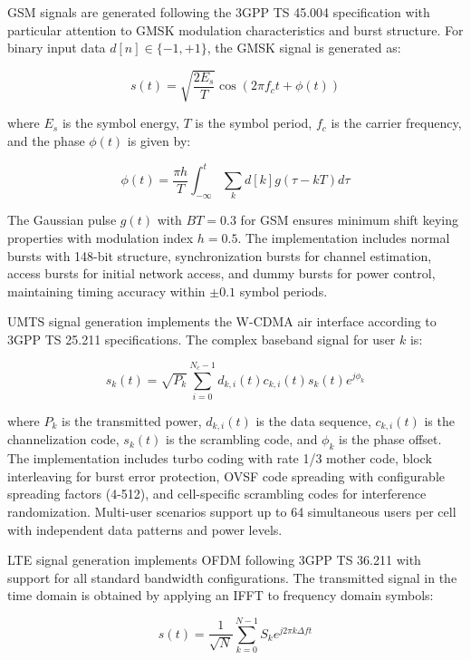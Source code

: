 \documentclass[twocolumn,10pt]{article}
\begin{document}
GSM signals are generated following the 3GPP TS 45.004 specification with particular attention to GMSK modulation characteristics and burst structure. For binary input data $d[n] \in \{-1, +1\}$, the GMSK signal is generated as:

\begin{equation}
s(t) = \sqrt{\frac{2E_s}{T}} \cos\left(2\pi f_c t + \phi(t)\right)
\end{equation}

where $E_s$ is the symbol energy, $T$ is the symbol period, $f_c$ is the carrier frequency, and the phase $\phi(t)$ is given by:

\begin{equation}
\phi(t) = \frac{\pi h}{T} \int_{-\infty}^{t} \sum_{k} d[k] g(\tau - kT) d\tau
\end{equation}

The Gaussian pulse $g(t)$ with $BT = 0.3$ for GSM ensures minimum shift keying properties with modulation index $h = 0.5$. The implementation includes normal bursts with 148-bit structure, synchronization bursts for channel estimation, access bursts for initial network access, and dummy bursts for power control, maintaining timing accuracy within $\pm 0.1$ symbol periods.

UMTS signal generation implements the W-CDMA air interface according to 3GPP TS 25.211 specifications. The complex baseband signal for user $k$ is:

\begin{equation}
s_k(t) = \sqrt{P_k} \sum_{i=0}^{N_c-1} d_{k,i}(t) c_{k,i}(t) s_{k}(t) e^{j\phi_k}
\end{equation}

where $P_k$ is the transmitted power, $d_{k,i}(t)$ is the data sequence, $c_{k,i}(t)$ is the channelization code, $s_k(t)$ is the scrambling code, and $\phi_k$ is the phase offset. The implementation includes turbo coding with rate 1/3 mother code, block interleaving for burst error protection, OVSF code spreading with configurable spreading factors (4-512), and cell-specific scrambling codes for interference randomization. Multi-user scenarios support up to 64 simultaneous users per cell with independent data patterns and power levels.

LTE signal generation implements OFDM following 3GPP TS 36.211 with support for all standard bandwidth configurations. The transmitted signal in the time domain is obtained by applying an IFFT to frequency domain symbols:

\begin{equation}
s(t) = \frac{1}{\sqrt{N}} \sum_{k=0}^{N-1} S_k e^{j2\pi k \Delta f t}
\end{equation}
\end{document}
